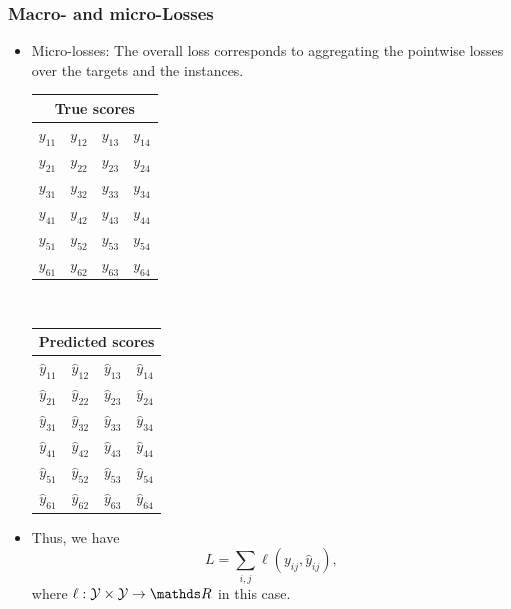 \begin{frame}
	\frametitle{Macro- and micro-Losses}
	
	\begin{itemize}
		\item<1-> Micro-losses: The overall loss corresponds to aggregating the pointwise losses over the targets and the instances.
		
		\begin{center}
			\begin{tabular}{|c|c|c|c|}
				\multicolumn{4}{c}{True scores} \\
				\hline
				\color{putred}$y_{11}$ & \color{putred}$y_{12}$ & \color{putred}$y_{13}$ & \color{putred}$y_{14}$ \\
				\color{putred}$y_{21}$ & \color{putred}$y_{22}$ & \color{putred}$y_{23}$ & \color{putred}$y_{24}$ \\
				\color{putred}$y_{31}$ & \color{putred}$y_{32}$ & \color{putred}$y_{33}$ & \color{putred}$y_{34}$ \\
				\color{putred}$y_{41}$ & \color{putred}$y_{42}$ & \color{putred}$y_{43}$ & \color{putred}$y_{44}$ \\
				\color{putred}$y_{51}$ & \color{putred}$y_{52}$ & \color{putred}$y_{53}$ & \color{putred}$y_{54}$ \\
				\color{putred}$y_{61}$ & \color{putred}$y_{62}$ & \color{putred}$y_{63}$ & \color{putred}$y_{64}$ \\
				\hline
			\end{tabular}
			$\quad$
			\begin{tabular}{|c|c|c|c|}
				\multicolumn{4}{c}{Predicted scores} \\
				\hline
				\color{putred}$\hat{y}_{11}$ & \color{putred}$\hat{y}_{12}$ & \color{putred}$\hat{y}_{13}$ & \color{putred}$\hat{y}_{14}$ \\
				\color{putred}$\hat{y}_{21}$ & \color{putred}$\hat{y}_{22}$ & \color{putred}$\hat{y}_{23}$ & \color{putred}$\hat{y}_{24}$ \\
				\color{putred}$\hat{y}_{31}$ & \color{putred}$\hat{y}_{32}$ & \color{putred}$\hat{y}_{33}$ & \color{putred}$\hat{y}_{34}$ \\
				\color{putred}$\hat{y}_{41}$ & \color{putred}$\hat{y}_{42}$ & \color{putred}$\hat{y}_{43}$ & \color{putred}$\hat{y}_{44}$ \\
				\color{putred}$\hat{y}_{51}$ & \color{putred}$\hat{y}_{52}$ & \color{putred}$\hat{y}_{53}$ & \color{putred}$\hat{y}_{54}$ \\
				\color{putred}$\hat{y}_{61}$ & \color{putred}$\hat{y}_{62}$ & \color{putred}$\hat{y}_{63}$ & \color{putred}$\hat{y}_{64}$ \\
				\hline
			\end{tabular}
		\end{center}
	\lz
	\item Thus, we have	
	$$
	L =  \sum_{i,j} \ell(y_{ij} , \hat{y}_{ij}),
	$$
	where $\ell: \Yspace \times \Yspace \to \R$ in this case.
%	
	\end{itemize}

\end{frame}


